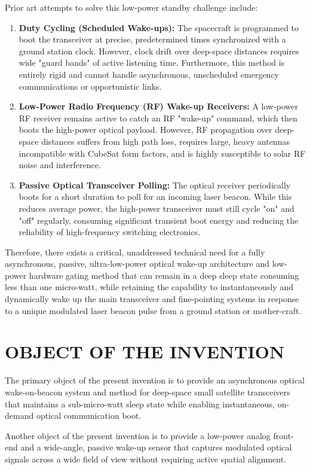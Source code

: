 \documentclass[12pt,a4paper]{article}
\begin{document}
Prior art attempts to solve this low-power standby challenge include:
\begin{enumerate}
    \item \textbf{Duty Cycling (Scheduled Wake-ups):} The spacecraft is programmed to boot the transceiver at precise, predetermined times synchronized with a ground station clock. However, clock drift over deep-space distances requires wide "guard bands" of active listening time. Furthermore, this method is entirely rigid and cannot handle asynchronous, unscheduled emergency communications or opportunistic links.
    \item \textbf{Low-Power Radio Frequency (RF) Wake-up Receivers:} A low-power RF receiver remains active to catch an RF "wake-up" command, which then boots the high-power optical payload. However, RF propagation over deep-space distances suffers from high path loss, requires large, heavy antennas incompatible with CubeSat form factors, and is highly susceptible to solar RF noise and interference.
    \item \textbf{Passive Optical Transceiver Polling:} The optical receiver periodically boots for a short duration to poll for an incoming laser beacon. While this reduces average power, the high-power transceiver must still cycle "on" and "off" regularly, consuming significant transient boot energy and reducing the reliability of high-frequency switching electronics.
\end{enumerate}

Therefore, there exists a critical, unaddressed technical need for a fully asynchronous, passive, ultra-low-power optical wake-up architecture and low-power hardware gating method that can remain in a deep sleep state consuming less than one micro-watt, while retaining the capability to instantaneously and dynamically wake up the main transceiver and fine-pointing systems in response to a unique modulated laser beacon pulse from a ground station or mother-craft.

\section*{OBJECT OF THE INVENTION}
The primary object of the present invention is to provide an asynchronous optical wake-on-beacon system and method for deep-space small satellite transceivers that maintains a sub-micro-watt sleep state while enabling instantaneous, on-demand optical communication boot.

Another object of the present invention is to provide a low-power analog front-end and a wide-angle, passive wake-up sensor that captures modulated optical signals across a wide field of view without requiring active spatial alignment.
\end{document}

